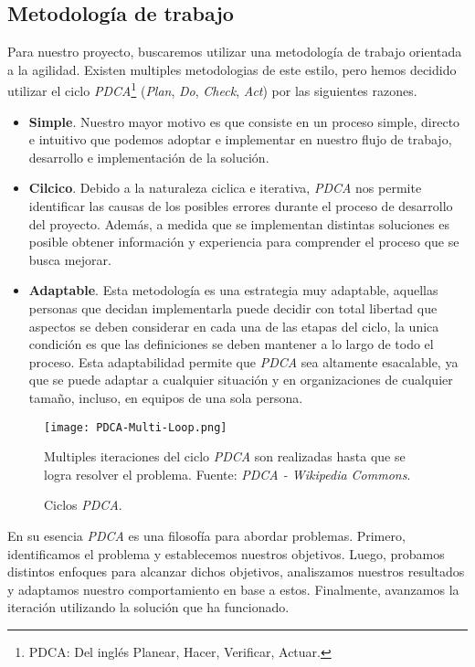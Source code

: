 

\subsection{Metodología de trabajo}

Para nuestro proyecto, buscaremos utilizar una metodología de trabajo orientada a la agilidad. Existen multiples metodologias de este estilo, pero hemos decidido utilizar el ciclo \textit{PDCA}\footnote{PDCA: Del inglés Planear, Hacer, Verificar, Actuar.} (\textit{Plan}, \textit{Do}, \textit{Check}, \textit{Act}) por las siguientes razones.

\begin{itemize}
    \item \textbf{Simple}. Nuestro mayor motivo es que consiste en un proceso simple, directo e intuitivo que podemos adoptar e implementar en nuestro flujo de trabajo, desarrollo e implementación de la solución.
    \item \textbf{Cilcico}. Debido a la naturaleza ciclica e iterativa, \textit{PDCA} nos permite identificar las causas de los posibles errores durante el proceso de desarrollo del proyecto. Además, a medida que se implementan distintas soluciones es posible obtener información y experiencia para comprender el proceso que se busca mejorar.
    \item \textbf{Adaptable}. Esta metodología es una estrategia muy adaptable, aquellas personas que decidan implementarla puede decidir con total libertad que aspectos se deben considerar en cada una de las etapas del ciclo, la unica condición es que las definiciones se deben mantener a lo largo de todo el proceso. Esta adaptabilidad permite que \textit{PDCA} sea altamente esacalable, ya que se puede adaptar a cualquier situación y en organizaciones de cualquier tamaño, incluso, en equipos de una sola persona.
\end{itemize}

\begin{figure}[ht]
    \centering
    \texttt{[image: PDCA-Multi-Loop.png]}
    \caption{Ciclos \textit{PDCA}.} Multiples iteraciones del ciclo \textit{PDCA} son realizadas hasta que se logra resolver el problema. Fuente: \textit{PDCA - Wikipedia Commons}.
    \label{fig:pdca-cycle}
\end{figure}

En su esencia \textit{PDCA} es una filosofía para abordar problemas. Primero, identificamos el problema y establecemos nuestros objetivos. Luego, probamos distintos enfoques para alcanzar dichos objetivos, analiszamos nuestros resultados y adaptamos nuestro comportamiento en base a estos. Finalmente, avanzamos la iteración utilizando la solución que ha funcionado.

